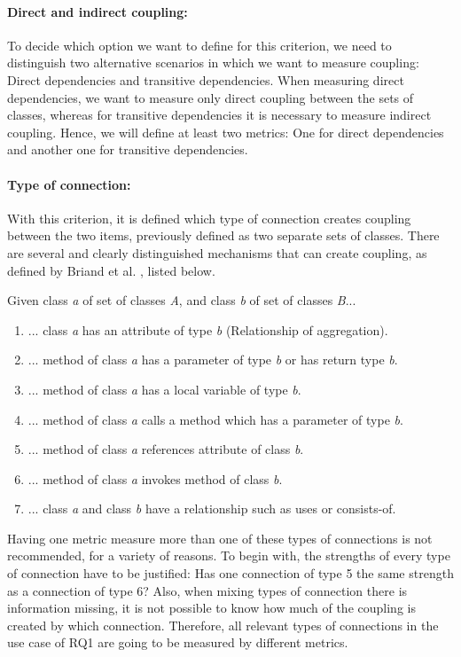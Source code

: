 \paragraph{Direct and indirect coupling:}
To decide which option we want to define for this criterion, we need to distinguish two alternative scenarios in which we want to measure coupling: Direct dependencies and transitive dependencies. When measuring direct dependencies, we want to measure only direct coupling between the sets of classes, whereas for transitive dependencies it is necessary to measure indirect coupling. Hence, we will define at least two metrics: One for direct dependencies and another one for transitive dependencies.



\paragraph{Type of connection:}
With this criterion, it is defined which type of connection creates coupling between the two items, previously defined as two separate sets of classes. There are several and clearly distinguished mechanisms that can create coupling, as defined by Briand et al. \cite{briand1999unified}, listed below.

\blankls
Given class \textit{a} of set of classes \textit{A}, and class \textit{b} of set of classes \textit{B}...

\begin{enumerate}
  \item ... class \textit{a} has an attribute of type \textit{b} (Relationship of aggregation).
  \item ... method of class \textit{a} has a parameter of type \textit{b} or has return type \textit{b}.
  \item ... method of class \textit{a} has a local variable of type \textit{b}.
  \item ... method of class \textit{a} calls a method which has a parameter of type \textit{b}.
  \item ... method of class \textit{a} references attribute of class \textit{b}.
  \item ... method of class \textit{a} invokes method of class \textit{b}.
  \item ... class \textit{a} and class \textit{b} have a relationship such as uses or consists-of.
\end{enumerate}

Having one metric measure more than one of these types of connections is not recommended, for a variety of reasons. To begin with, the strengths of every type of connection have to be justified: Has one connection of type 5 the same strength as a connection of type 6? Also, when mixing types of connection there is information missing, it is not possible to know how much of the coupling is created by which connection. Therefore, all relevant types of connections in the use case of RQ1 are going to be measured by different metrics.

